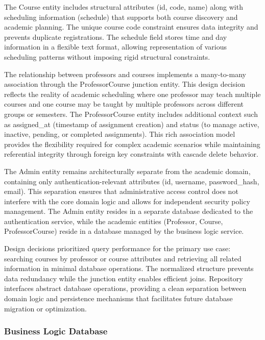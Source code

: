 \documentclass[12pt,a4paper]{article}
\begin{document}
The Course entity includes structural attributes (id, code, name) along with scheduling information (schedule) that supports both course discovery and academic planning. The unique course code constraint ensures data integrity and prevents duplicate registrations. The schedule field stores time and day information in a flexible text format, allowing representation of various scheduling patterns without imposing rigid structural constraints.\newline

The relationship between professors and courses implements a many-to-many association through the ProfessorCourse junction entity. This design decision reflects the reality of academic scheduling where one professor may teach multiple courses and one course may be taught by multiple professors across different groups or semesters. The ProfessorCourse entity includes additional context such as assigned\_at (timestamp of assignment creation) and status (to manage active, inactive, pending, or completed assignments). This rich association model provides the flexibility required for complex academic scenarios while maintaining referential integrity through foreign key constraints with cascade delete behavior.\newline

The Admin entity remains architecturally separate from the academic domain, containing only authentication-relevant attributes (id, username, password\_hash, email). This separation ensures that administrative access control does not interfere with the core domain logic and allows for independent security policy management. The Admin entity resides in a separate database dedicated to the authentication service, while the academic entities (Professor, Course, ProfessorCourse) reside in a database managed by the business logic service.\newline

Design decisions prioritized query performance for the primary use case: searching courses by professor or course attributes and retrieving all related information in minimal database operations. The normalized structure prevents data redundancy while the junction entity enables efficient joins. Repository interfaces abstract database operations, providing a clean separation between domain logic and persistence mechanisms that facilitates future database migration or optimization.

\subsubsection{Business Logic Database}
\end{document}
